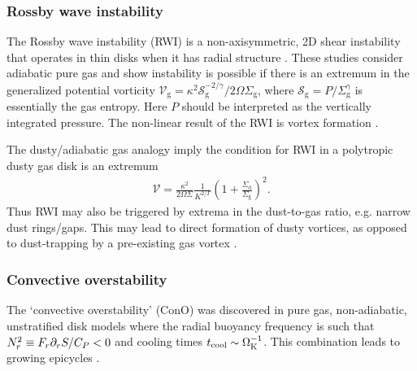 
\subsubsection{Rossby wave instability}
The Rossby wave instability (RWI) is a non-axisymmetric, 2D shear
instability that operates in thin disks when it has radial structure
\citep{lovelace99,li00}. These studies consider adiabatic pure gas and 
show instability is possible if there is an extremum in the generalized
potential vorticity 
 $\mathcal{V}_\mathrm{g} =
 \kappa^2\mathcal{S}_\mathrm{g}^{-2/\gamma}/2\Omega\Sigma_\mathrm{g}$, 
where $\mathcal{S}_\mathrm{g} = P/\Sigma_\mathrm{g}^\gamma$ is essentially
the gas entropy. Here $P$
should be interpreted as the vertically integrated pressure. The
non-linear result of the RWI is vortex formation \citep{li01}. 

The dusty/adiabatic gas analogy imply the condition for RWI in a
polytropic dusty gas disk is an extremum   
\begin{align}
  \mathcal{V} =
  \frac{\kappa^2}{2\Omega\Sigma}\frac{1}{K^{2/\Gamma}}\left(1+
    \frac{\Sigma_\mathrm{d}}{\Sigma_\mathrm{g}}\right)^2.    
\end{align}
Thus RWI may also be triggered by extrema 
in the dust-to-gas ratio, e.g. narrow dust rings/gaps. This may lead 
to direct formation of dusty vortices, as opposed to dust-trapping by  
a pre-existing gas vortex \citep{barge95,lyra13}.  



\subsubsection{Convective overstability}
The `convective overstability' (ConO) was discovered in pure gas, non-adiabatic, unstratified disk models    
where the radial buoyancy frequency is such that $N_r^2\equiv
F_r\partial_rS/C_P  < 0 $ and cooling times $t_\mathrm{cool}\sim \Omega_{\rm K}^{-1}$. This
combination leads to growing epicycles
\citep{klahr14,lyra14,latter16}.     

